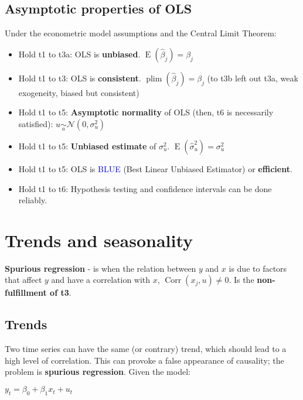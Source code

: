 \documentclass[10pt, a4paper, landscape]{article}
\DeclareMathOperator{\E}{E}
\DeclareMathOperator{\Corr}{Corr}
\begin{document}
\begin{multicols}{3}
\subsection*{Asymptotic properties of OLS}

Under the econometric model assumptions and the Central Limit Theorem:

\begin{itemize}[leftmargin=*]
	\item Hold t1 to t3a: OLS is \textbf{unbiased}. \( \E(\hat{\beta}_{j}) = \beta_{j} \)
	\item Hold t1 to t3: OLS is \textbf{consistent}. \( \operatorname{plim}(\hat{\beta}_{j}) = \beta_{j} \) (to t3b left out t3a, weak exogeneity, biased but consistent)
	\item Hold t1 to t5: \textbf{Asymptotic normality} of OLS (then, t6 is necessarily satisfied): \( u \underset{a}{\sim} \mathcal{N} (0, \sigma_{u}^{2}) \)
	\item Hold t1 to t5: \textbf{Unbiased estimate} of \( \sigma_{u}^{2} \). \( \E(\hat{\sigma}_{u}^{2}) = \sigma^{2}_{u} \)
	\item Hold t1 to t5: OLS is \textcolor{blue}{BLUE} (Best Linear Unbiased Estimator) or \textbf{efficient}.
	\item Hold t1 to t6: Hypothesis testing and confidence intervals can be done reliably.
\end{itemize}

\columnbreak

\section*{Trends and seasonality}

\textbf{Spurious regression} - is when the relation between \( y \) and \( x \) is due to factors that affect \( y \) and have a correlation with \( x \), \( \Corr(x_{j}, u) \neq 0 \). Is the \textbf{non-fulfillment of t3}.

\subsection*{Trends}

Two time series can have the same (or contrary) trend, which should lead to a high level of correlation. This can provoke a false appearance of causality; the problem is \textbf{spurious regression}. Given the model:

\begin{center}
	\( y_{t} = \beta_{0} + \beta_{1} x_{t} + u_{t} \)
\end{center}


\end{multicols}
\end{document}

